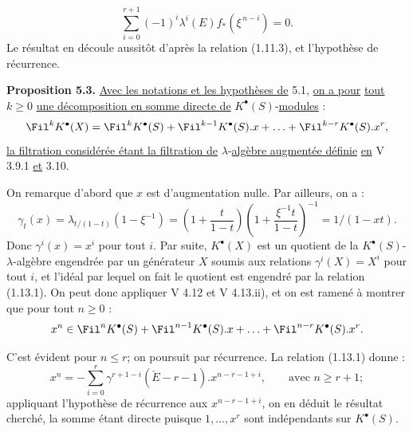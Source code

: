 
\[
  \sum_{i=0}^{r+1}(-1)^i\lambda^i(E)f_*(\xi^{\,n-i})=0 .
\]
Le
résultat en découle aussitôt d'après la relation (1.11.3), et l'hypothèse de récurrence.

\textbf{Proposition 5.3.} \uline{Avec les notations et les hypothèses de} 5.1, \uline{on a pour} \uline{tout} $k\ge 0$ \uline{une décomposition en somme directe de} $K^{\bullet}(S)$-\uline{modules} :
\begin{equation}\notag
  \Fil^kK^{\bullet}(X)=\Fil^kK^{\bullet}(S)+\Fil^{k-1}K^{\bullet}(S).x+\ldots+\Fil^{k-r}K^{\bullet}(S).x^r,
\end{equation}
\uline{la filtration considérée étant la filtration de} $\lambda$-\uline{algèbre augmentée définie} \uline{en} V 3.9.1 \uline{et} 3.10.

On remarque d'abord que $x$ est d'augmentation nulle. Par ailleurs, on a :
\[
  \gamma_t(x)=\lambda_{t/(1-t)}(1-\xi^{-1})
  =\left(1+\frac{t}{1-t}\right)\left(1+\frac{\xi^{-1}t}{1-t}\right)^{-1}
  =1/(1-xt) .
\]
Donc $\gamma^i(x)=x^i$ pour tout $i$. Par suite, $K^{\bullet}(X)$ est un quotient de la $K^{\bullet}(S)$-$\lambda$-algèbre engendrée par un générateur $X$ soumis aux relations $\gamma^i(X)=X^i$ pour tout $i$, et l'idéal par lequel on fait le quotient est engendré par la relation (1.13.1). On peut donc appliquer V 4.12 et V 4.13.ii), et on est ramené à montrer que pour tout $n\ge 0$ :
\[
  x^n\in \Fil^nK^{\bullet}(S)+\Fil^{n-1}K^{\bullet}(S).x+\ldots+\Fil^{n-r}K^{\bullet}(S).x^r .
\]

C'est évident pour $n\le r$; on poursuit par récurrence. La relation (1.13.1) donne :
\[
  x^n=-\sum_{i=0}^{r}\gamma^{r+1-i}(\check E-r-1).x^{n-r-1+i},\qquad \text{avec } n\ge r+1;
\]
appliquant l'hypothèse de récurrence aux $x^{n-r-1+i}$, on en déduit le résultat cherché, la somme étant directe puisque $1,\ldots,x^r$ sont indépendants sur $K^{\bullet}(S)$.

